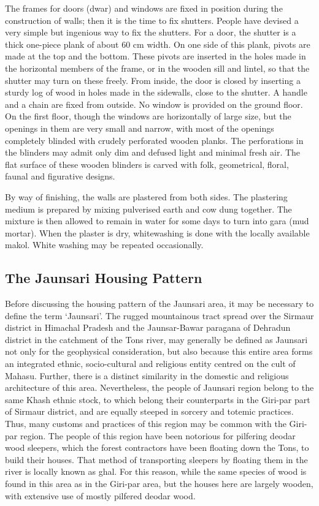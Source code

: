 The frames for doors (dwar) and windows are fixed in position during the construction of walls; then it is the time to fix shutters. People have devised a very simple but ingenious way to fix the shutters. For a door, the shutter is a thick one-piece plank of about 60 cm width. On one side of this plank, pivots are made at the top and the bottom. These pivots are inserted in the holes made in the horizontal members of the frame, or in the wooden sill and lintel, so that the shutter may turn on these freely. From inside, the door is closed by inserting a sturdy log of wood in holes made in the sidewalls, close to the shutter. A handle and a chain are fixed from outside. No window is provided on the ground floor. On the first floor, though the windows are horizontally of large size, but the openings in them are very small and narrow, with most of the openings completely blinded with crudely perforated wooden planks. The perforations in the blinders may admit only dim and defused light and minimal fresh air. The flat surface of these wooden blinders is carved with folk, geometrical, floral, faunal and figurative designs.

By way of finishing, the walls are plastered from both sides. The plastering medium is prepared by mixing pulverised earth and cow dung together. The mixture is then allowed to remain in water for some days to turn into gara (mud mortar). When the plaster is dry, whitewashing is done with the locally available makol. White washing may be repeated occasionally.


\subsection*{The Jaunsari Housing Pattern}

Before discussing the housing pattern of the Jaunsari area, it may be necessary to define the term ‘Jaunsari’. The rugged mountainous tract spread over the Sirmaur district in Himachal Pradesh and the Jaunsar-Bawar paragana of Dehradun district in the catchment of the Tons river, may generally be defined as Jaunsari not only for the geophysical consideration, but also because this entire area forms an integrated ethnic, socio-cultural and religious entity centred on the cult of Mahasu. Further, there is a distinct similarity in the domestic and religious architecture of this area. Nevertheless, the people of Jaunsari region belong to the same Khash ethnic stock, to which belong their counterparts in the Giri-par part of Sirmaur district, and are equally steeped in sorcery and totemic practices. Thus, many customs and practices of this region may be common with the Giri-par region. The people of this region have been notorious for pilfering deodar wood sleepers, which the forest contractors have been floating down the Tons, to build their houses. That method of transporting sleepers by floating them in the river is locally known as ghal. For this reason, while the same species of wood is found in this area as in the Giri-par area, but the houses here are largely wooden, with extensive use of mostly pilfered deodar wood.

